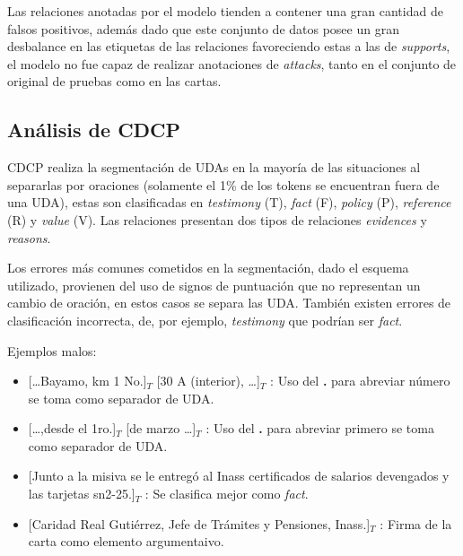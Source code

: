 \documentclass[a4paper,11pt,twocolumn,twoside]{article}
\begin{document}
Las relaciones anotadas por el modelo tienden a contener una gran cantidad de falsos positivos, además
dado que este conjunto de datos posee un gran desbalance en las etiquetas de las relaciones favoreciendo 
estas a las de \textit{supports}, el modelo no fue capaz de realizar anotaciones de \textit{attacks}, tanto en 
el conjunto de original de pruebas como en las cartas.

\subsection{Análisis de CDCP}


CDCP realiza la segmentación de UDAs en la mayoría de las situaciones al separarlas por oraciones 
(solamente el 1\% de los tokens se encuentran fuera de una UDA),
estas son clasificadas en \textit{testimony} (T), \textit{fact} (F), \textit{policy} (P), \textit{reference} (R)
y \textit{value} (V). Las relaciones presentan dos tipos de relaciones \textit{evidences} y \textit{reasons}.

Los errores más comunes cometidos en la segmentación, dado el esquema utilizado, provienen del uso 
de signos de puntuación que no representan un cambio de oración, en estos casos se separa las UDA. También
existen errores de clasificación incorrecta, de, por ejemplo, \textit{testimony} que podrían ser \textit{fact}.

Ejemplos malos:
\begin{itemize}
	\item \text{} [\dots Bayamo, km 1 No.]$_T$ [30 A (interior), \dots]$_T$
	      : Uso del \textbf{.} para abreviar número se toma como separador de UDA. %
	\item \text{} [\dots ,desde el 1ro.]$_T$ [de marzo \dots]$_T$
	      : Uso del \textbf{.} para abreviar primero se toma como separador de UDA. %
	\item \text{} [Junto a la misiva se le entregó al Inass certificados de salarios devengados y las tarjetas sn2-25.]$_T$
	      : Se clasifica mejor como \textit{fact}. %
	\item \text{} [Caridad Real Gutiérrez, Jefe de Trámites y Pensiones, Inass.]$_T$
	      : Firma de la carta como elemento argumentaivo. %
\end{itemize}
\end{document}
